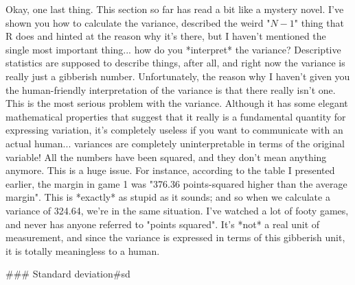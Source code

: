 Okay, one last thing. This section so far has read a bit like a mystery novel. I've shown you how to calculate the variance, described the weird "$N-1$" thing that R does and hinted at the reason why it's there, but I haven't mentioned the single most important thing... how do you *interpret* the variance? Descriptive statistics are supposed to describe things, after all, and right now the variance is really just a gibberish number. Unfortunately, the reason why I haven't given you the human-friendly interpretation of the variance is that there really isn't one. This is the most serious problem with the variance. Although it has some elegant mathematical properties that suggest that it really is a fundamental quantity for expressing variation, it's completely useless if you want to communicate with an actual human... variances are completely uninterpretable in terms of the original variable! All the numbers have been squared, and they don't mean anything anymore. This is a huge issue. For instance, according to the table I presented earlier, the margin in game 1 was "376.36 points-squared higher than the average margin". This is *exactly* as stupid as it sounds; and so when we calculate a variance of 324.64, we're in the same situation. I've watched a lot of footy games, and never has anyone referred to "points squared". It's *not* a real unit of measurement, and since the variance is expressed in terms of this gibberish unit, it is totally meaningless to a human.

### Standard deviation{#sd}

